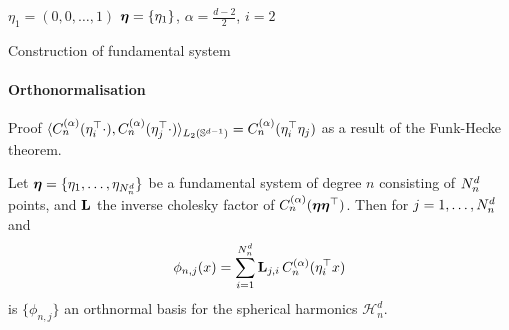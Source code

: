\begin{algorithm}[H]
    \SetAlgoLined
    \DontPrintSemicolon
    $\eta_1 = (0,0,\ldots,1)$ 
    $\boldsymbol{\eta} = \{\eta_1\}$,
    $\alpha = \frac{d-2}{2}$,
    $i = 2$\;
     \caption{Construction of fundamental system\label{alg:fundamental-system}}
\end{algorithm}

\paragraph{Orthonormalisation}

Proof $\langle C_n^{(\alpha)}(\eta_i^{\top} \cdot), C_n^{(\alpha)}(\eta_j^{\top} \cdot) \rangle_{L_2(\mathbb{S}^{d-1})} = C_n^{(\alpha)}(\eta_i^{\top}\eta_j)$ as a result of the Funk-Hecke theorem.

\begin{theorem}
   Let $\boldsymbol{\eta} = \{\eta_1, \ldots, \eta_{N^d_n}\}$ be a fundamental system of degree $n$ consisting of $N^d_n$ points, and $\mathbf{{L}}$ the inverse cholesky factor of $C_n^{(\alpha)}(\boldsymbol{\eta}\boldsymbol{\eta}^{\top})$. Then for $j=1,\ldots,N^d_n$ and
    \begin{equation}
    \phi_{n,j}(x) = \sum_{i=1}^{N^d_n} \mathbf{{L}}_{j,i}\,C_n^{(\alpha)}(\eta_i^{\top} x)
    \end{equation}
    is $\{\phi_{n,j}\}$ an orthnormal basis for the spherical harmonics $\mathcal{H}_n^d$.
\end{theorem}
